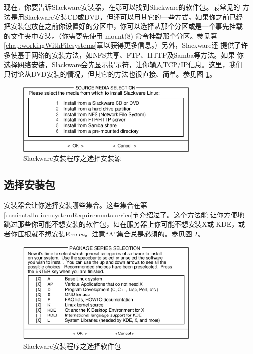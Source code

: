 现在，你要告诉Slackware安装器，在哪可以找到Slackware的软件包。最常见的
方法是用Slackware安装CD或DVD，但还可以用其它的一些方式。如果你之前已经
把安装包放在之前你设置好的分区中，你可以选择从那个分区或是一个事先挂载
的文件夹中安装。（你需要先使用 mount(8) 命令挂载那个分区。参见第
\ref{chap:workingWithFilesystems}章以获得更多信息。）另外，Slackware还
提供了许多使基于网络的安装方法，如NFS共享、FTP、HTTP及Samba等方法。如果
你选择网络安装，Slackware会先显示提示符，让你输入TCP/IP信息。这里，我们
只讨论从DVD安装的情况，但其它的方法也很直接、简单。参见图
\ref{fig:setup-source}。
\begin{figure}[htbf]
  \centering
  \includegraphics[width=0.8\textwidth]{images/installation/setup-source.eps}
  \caption{Slackware安装程序之选择安装源}
  \label{fig:setup-source}
\end{figure}

\subsection{选择安装包}
\label{sec:installation:setup:select}

安装器会让你选择安装哪些集合。这些集合在第
\ref{sec:installation:systemRequirements:series}节介绍过了。这个方法能
让你方便地跳过那些你可能不想安装的软件包，如在服务器上你可能不想安装X或
KDE，或者你压根就不想安装Emacs。注意``A''集合总是必须的。参见图
\ref{fig:setup-select}。
\begin{figure}[htbf]
  \centering
  \includegraphics[width=0.8\textwidth]{images/installation/setup-select.eps}
  \caption{Slackware安装程序之选择软件包}
  \label{fig:setup-select}
\end{figure}

